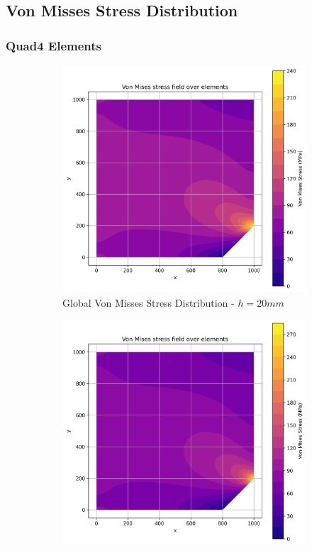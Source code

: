 \subsection{Von Misses Stress Distribution}

\subsubsection{Quad4 Elements}

\begin{figure}[H]
  \centering
  \begin{subfigure}[b]{0.45\textwidth}
    \centering
    \includegraphics[width=\textwidth]{GRAFICOS/Quad4/2mm_global/resultados_von_mises.png}
    \caption{Global Von Misses Stress Distribution - $h=20mm$}
    \label{fig:img1}
  \end{subfigure}
  \hfill
  \begin{subfigure}[b]{0.45\textwidth}
    \centering
    \includegraphics[width=\textwidth]{GRAFICOS/Quad4/2mm_local/resultados_von_mises.png}

\end{subfigure}
\end{figure}
